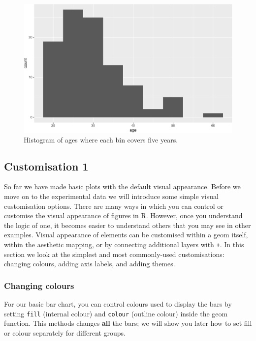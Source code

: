 \documentclass[
  english,
  doc,floatsintext]{apa6}
\begin{document}
\begin{figure}

{\centering \includegraphics[width=1\linewidth]{images/histogram2-1} 

}

\caption{Histogram of ages where each bin covers five years.}\label{fig:histogram2}
\end{figure}

\hypertarget{customisation-1}{%
\subsection{Customisation 1}\label{customisation-1}}

So far we have made basic plots with the default visual appearance. Before we move on to the experimental data we will introduce some simple visual customisation options. There are many ways in which you can control or customise the visual appearance of figures in R. However, once you understand the logic of one, it becomes easier to understand others that you may see in other examples. Visual appearance of elements can be customised within a geom itself, within the aesthetic mapping, or by connecting additional layers with \texttt{+}. In this section we look at the simplest and most commonly-used customisations: changing colours, adding axis labels, and adding themes.

\hypertarget{changing-colours}{%
\subsubsection{Changing colours}\label{changing-colours}}

For our basic bar chart, you can control colours used to display the bars by setting \texttt{fill} (internal colour) and \texttt{colour} (outline colour) inside the geom function. This methods changes \textbf{all} the bars; we will show you later how to set fill or colour separately for different groups.
\end{document}
